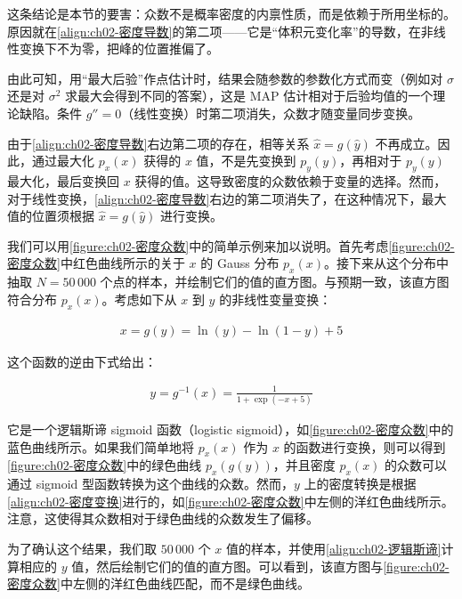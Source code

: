 \documentclass[../../main.tex]{subfiles}
\begin{document}
\begin{remark}
这条结论是本节的要害：众数不是概率密度的内禀性质，而是依赖于所用坐标的。原因就在\eqref{align:ch02-密度导数}的第二项——它是“体积元变化率”的导数，在非线性变换下不为零，把峰的位置推偏了。

由此可知，用“最大后验”作点估计时，结果会随参数的参数化方式而变（例如对 $\sigma$ 还是对 $\sigma^{2}$ 求最大会得到不同的答案），这是 MAP 估计相对于后验均值的一个理论缺陷。条件 $g''=0$（线性变换）时第二项消失，众数才随变量同步变换。
\end{remark}

由于\eqref{align:ch02-密度导数}右边第二项的存在，相等关系 $\hat{x}=g(\hat{y})$ 不再成立。因此，通过最大化 $p_x(x)$ 获得的 $x$ 值，不是先变换到 $p_y(y)$，再相对于 $p_y(y)$ 最大化，最后变换回 $x$ 获得的值。这导致密度的众数依赖于变量的选择。然而，对于线性变换，\eqref{align:ch02-密度导数}右边的第二项消失了，在这种情况下，最大值的位置须根据 $\hat{x}=g(\hat{y})$ 进行变换。

我们可以用\cref{figure:ch02-密度众数}中的简单示例来加以说明。首先考虑\cref{figure:ch02-密度众数}中红色曲线所示的关于 $x$ 的 Gauss 分布 $p_x(x)$。接下来从这个分布中抽取 $N=50\,000$ 个点的样本，并绘制它们的值的直方图。与预期一致，该直方图符合分布 $p_x(x)$。考虑如下从 $x$ 到 $y$ 的非线性变量变换：

\begin{align}
  x = g(y) = \ln(y) - \ln(1-y) + 5
  \label{align:ch02-非线性变换}
\end{align}

这个函数的逆由下式给出：

\begin{align}
  y = g^{-1}(x) = \frac{1}{1+\exp(-x+5)}
  \label{align:ch02-逻辑斯谛}
\end{align}

它是一个逻辑斯谛 sigmoid 函数（logistic sigmoid），如\cref{figure:ch02-密度众数}中的蓝色曲线所示。如果我们简单地将 $p_x(x)$ 作为 $x$ 的函数进行变换，则可以得到\cref{figure:ch02-密度众数}中的绿色曲线 $p_x(g(y))$，并且密度 $p_x(x)$ 的众数可以通过 sigmoid 型函数转换为这个曲线的众数。然而，$y$ 上的密度转换是根据\eqref{align:ch02-密度变换}进行的，如\cref{figure:ch02-密度众数}中左侧的洋红色曲线所示。注意，这使得其众数相对于绿色曲线的众数发生了偏移。

为了确认这个结果，我们取 $50\,000$ 个 $x$ 值的样本，并使用\eqref{align:ch02-逻辑斯谛}计算相应的 $y$ 值，然后绘制它们的值的直方图。可以看到，该直方图与\cref{figure:ch02-密度众数}中左侧的洋红色曲线匹配，而不是绿色曲线。
\end{document}
